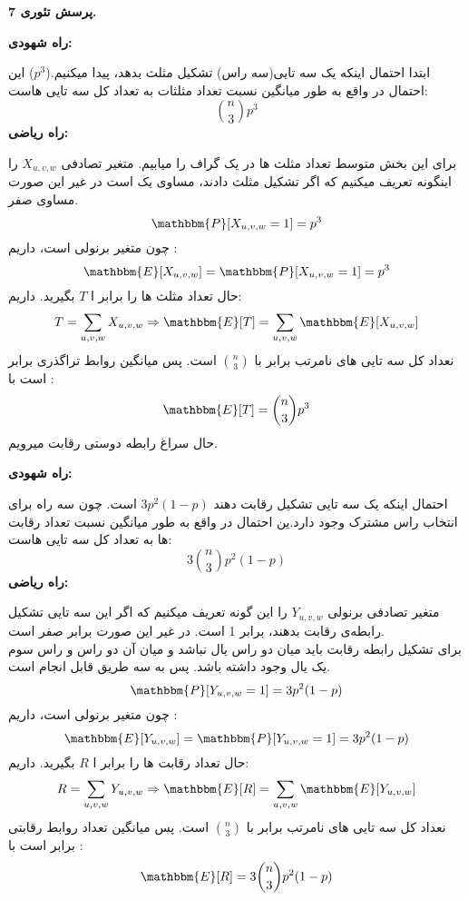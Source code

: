 \documentclass[11pt]{article}
\begin{document}
\begin{persian}
\textbf{پرسش تئوری 7.}

\textbf{راه شهودی:}

ابتدا احتمال اینکه یک سه تایی(سه راس) تشکیل مثلث بدهد، پیدا میکنیم.($p^3$) این احتمال در واقع به طور میانگین نسبت تعداد مثلثات به تعداد کل سه تایی هاست:
$$
{n \choose 3} p^3
$$
\textbf{راه ریاضی:}

برای این بخش متوسط تعداد مثلث ها در یک گراف را میابیم. متغیر تصادفی 
$X_{u,v,w}$ 
را اینگونه تعریف میکنیم که اگر تشکیل مثلث دادند، مساوی یک است در غیر این صورت مساوی صفر.
$$
\mathbbm{P}[X_{u,v,w} = 1] = p^3 
$$
چون متغیر برنولی است، داریم :
$$
\mathbbm{E}[X_{u,v,w}] = \mathbbm{P}[X_{u,v,w} = 1] = p^3
$$
حال تعداد مثلث ها را برابر ا $T$ بگیرید. داریم:
$$
T = \sum_{u,v,w} X_{u,v,w} \Rightarrow \mathbbm{E}[T] = \sum_{u,v,w} \mathbbm{E}[X_{u,v,w}] 
$$
نعداد کل سه تایی های نامرتب برابر با 
${n \choose 3}$
است. پس میانگین روابط تراگذری برابر است با :
$$
\mathbbm{E}[T] = {n \choose 3} p^3
$$
حال سراغ رابطه دوستی رقابت میرویم. 

\textbf{راه شهودی:} 

احتمال اینکه یک سه تایی تشکیل رقابت دهند 
$3 p^2(1-p)$
است. چون سه راه برای انتخاب راس مشترک وجود دارد.ین احتمال در واقع به طور میانگین نسبت تعداد رقابت ها به تعداد کل سه تایی هاست:
$$
3{n \choose 3} p^2(1-p)
$$
\textbf{راه ریاضی:}

متغیر تصادفی برنولی
$Y_{u,v,w}$
را این گونه تعریف میکنیم که اگر این سه تایی تشکیل رابطه‌ی رقابت بدهند، برابر 1 است. در غیر این صورت برابر صفر است. \\
برای تشکیل رابطه رقابت باید میان دو راس یال نباشد و میان آن دو راس و راس سوم یک یال وجود داشته باشد. پس به سه طریق قابل انجام است.
$$
\mathbbm{P}[Y_{u,v,w} = 1] = 3 p^2(1-p)
$$
چون متغیر برنولی است، داریم :
$$
\mathbbm{E}[Y_{u,v,w}] = \mathbbm{P}[Y_{u,v,w} = 1] = 3 p^2(1-p)
$$
حال تعداد رقابت ها را برابر ا $R$ بگیرید. داریم:
$$
R = \sum_{u,v,w} Y_{u,v,w} \Rightarrow \mathbbm{E}[R] = \sum_{u,v,w} \mathbbm{E}[Y_{u,v,w}] 
$$
نعداد کل سه تایی های نامرتب برابر با 
${n \choose 3}$
است. پس میانگین تعداد روابط رقابتی برابر است با :
$$
\mathbbm{E}[R] = 3 {n \choose 3}  p^2(1-p)
$$


\end{persian}
\end{document}
